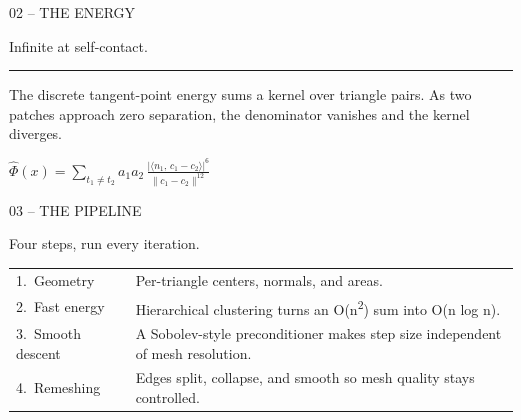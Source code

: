 \documentclass[aspectratio=169,14pt]{beamer}
\newcommand{\decklabel}[1]{%
  {\fontsize{8.5}{11}\selectfont\color{Label}\MakeUppercase{#1}\par}%
}
\newcommand{\slidetitle}[1]{%
  {\fontsize{25}{30}\selectfont\color{Text}\raggedright #1\par}%
}
\newcommand{\slidebody}[1]{%
  {\fontsize{12.2}{15.4}\selectfont\color{Dim}\raggedright #1\par}%
}
\newcommand{\steplabel}[1]{%
  {\fontsize{9}{11}\selectfont\color{Text}#1\par}%
}
\newcommand{\stepbody}[1]{%
  {\fontsize{9.5}{12.0}\selectfont\color{Dim}\raggedright #1\par}%
}
\newcommand{\thinrule}{%
  \par\vspace{0.24cm}%
  {\color{Rule}\rule{2.45cm}{0.35pt}}%
  \par\vspace{0.25cm}%
}
\begin{document}
\begin{frame}[plain]
  \vspace*{0.82cm}
  \hspace*{1.22cm}
  \begin{minipage}{0.78\paperwidth}
  \raggedright
  \decklabel{02 -- The energy}
  \vspace{0.54cm}
  \slidetitle{Infinite at self-contact.}
  \thinrule
  \slidebody{The discrete tangent-point energy sums a kernel over triangle pairs. As two patches approach zero separation, the denominator vanishes and the kernel diverges.}
  \vspace{0.45cm}
  \begin{center}
  {\fontsize{12}{14}\selectfont\color{Text}
  $\displaystyle
    \widehat{\Phi}(x)
      = \sum_{t_1 \ne t_2}
        a_1 a_2 \,
        \frac{\bigl|\langle n_1,\, c_1 - c_2\rangle\bigr|^{6}}
             {\|c_1 - c_2\|^{12}}
  $%
  }
  \end{center}
  \end{minipage}
\end{frame}

\begin{frame}[plain]
  \vspace*{0.45cm}
  \hspace*{1.22cm}
  \begin{minipage}{0.82\paperwidth}
  \raggedright
  \decklabel{03 -- The pipeline}
  \vspace{0.10cm}
  \slidetitle{Four steps, run every iteration.}
  \vspace{0.14cm}

  \renewcommand{\arraystretch}{1.05}
  \setlength{\tabcolsep}{4pt}
  \begin{tabular}{@{}p{2.9cm}p{9.7cm}@{}}
    \steplabel{1.\ Geometry} &
    \stepbody{Per-triangle centers, normals, and areas.} \\
    \steplabel{2.\ Fast energy} &
    \stepbody{Hierarchical clustering turns an O(n\textsuperscript{2}) sum into O(n log n).} \\
    \steplabel{3.\ Smooth descent} &
    \stepbody{A Sobolev-style preconditioner makes step size independent of mesh resolution.} \\
    \steplabel{4.\ Remeshing} &
    \stepbody{Edges split, collapse, and smooth so mesh quality stays controlled.} \\
  \end{tabular}
  \end{minipage}
\end{frame}
\end{document}
